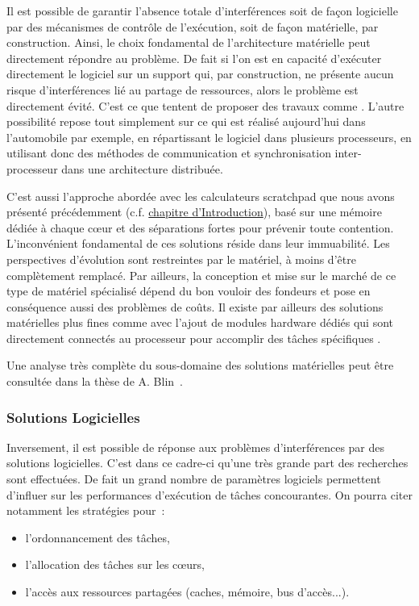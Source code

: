 \documentclass[french, a4paper, 11pt, twoside, pdftex]{StyleThese}
\begin{document}
    Il est possible de garantir l'absence totale d'interférences soit de façon logicielle par des mécanismes de contrôle de l'exécution, soit de façon matérielle, par construction. Ainsi, le choix fondamental de l'architecture matérielle peut directement répondre au problème. De fait si l'on est en capacité d'exécuter directement le logiciel sur un support qui, par construction, ne présente aucun risque d'interférences lié au partage de ressources, alors le problème est directement évité. C'est ce que tentent de proposer des travaux comme \cite{schoeberl_towards_2011}. L'autre possibilité repose tout simplement sur ce qui est réalisé aujourd'hui dans l'automobile par exemple, en répartissant le logiciel dans plusieurs processeurs, en utilisant donc des méthodes de communication et synchronisation inter-processeur dans une architecture distribuée.
    
    C'est aussi l'approche abordée avec les calculateurs scratchpad que nous avons présenté précédemment (c.f. \hyperref[Intro:multicoeurs]{chapitre d'Introduction}), basé sur une mémoire dédiée à chaque cœur et des séparations fortes pour prévenir toute contention. L'inconvénient fondamental de ces solutions réside dans leur immuabilité. Les perspectives d'évolution sont restreintes par le matériel, à moins d'être complètement remplacé. Par ailleurs, la conception et mise sur le marché de ce type de matériel spécialisé dépend du bon vouloir des fondeurs et pose en conséquence aussi des problèmes de coûts. Il existe par ailleurs des solutions matérielles plus fines comme avec l'ajout de modules hardware dédiés qui sont directement connectés au processeur pour accomplir des tâches spécifiques \cite{solet_hw-based_2018}. 
    
    Une analyse très complète du sous-domaine des solutions matérielles peut être consultée dans la thèse de A. Blin~\cite{blin_vers_2017}.
    
    
    \subsubsection{Solutions Logicielles}
    Inversement, il est possible de réponse aux problèmes d'interférences par des solutions logicielles. C'est dans ce cadre-ci qu'une très grande part des recherches sont effectuées. De fait un grand nombre de paramètres logiciels permettent d'influer sur les performances d'exécution de tâches concourantes. On pourra citer notamment les stratégies pour~: 
    \begin{itemize}
    	\item	l'ordonnancement des tâches,
    	\item	l'allocation des tâches sur les cœurs,
    	\item 	l'accès aux ressources partagées (caches, mémoire, bus d'accès...).
    \end{itemize}
\end{document}
